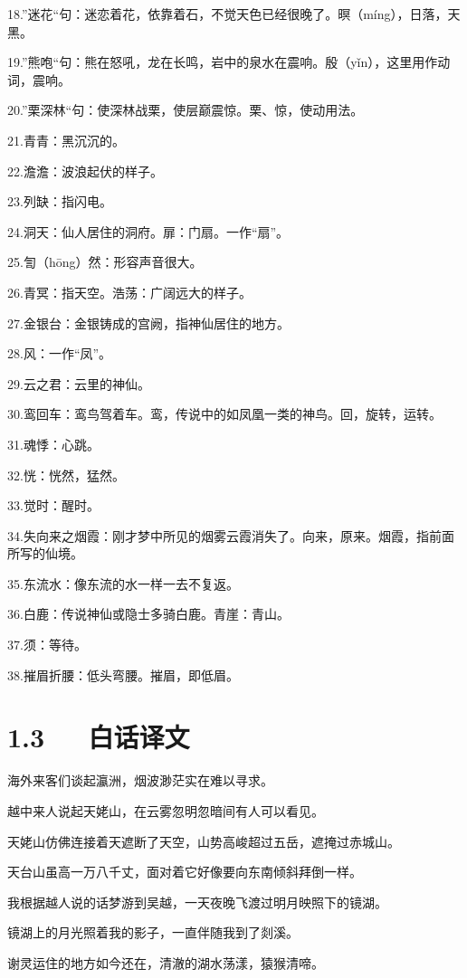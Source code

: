 \documentclass[letterpaper,10pt,english]{sphinxmanual}
\begin{document}
18.”迷花“句：迷恋着花，依靠着石，不觉天色已经很晚了。暝（míng），日落，天黑。

19.”熊咆“句：熊在怒吼，龙在长鸣，岩中的泉水在震响。殷（yǐn），这里用作动词，震响。

20.”栗深林“句：使深林战栗，使层巅震惊。栗、惊，使动用法。

21.青青：黑沉沉的。

22.澹澹：波浪起伏的样子。

23.列缺：指闪电。

24.洞天：仙人居住的洞府。扉：门扇。一作“扇”。

25.訇（hōng）然：形容声音很大。

26.青冥：指天空。浩荡：广阔远大的样子。

27.金银台：金银铸成的宫阙，指神仙居住的地方。

28.风：一作“凤”。

29.云之君：云里的神仙。

30.鸾回车：鸾鸟驾着车。鸾，传说中的如凤凰一类的神鸟。回，旋转，运转。

31.魂悸：心跳。

32.恍：恍然，猛然。

33.觉时：醒时。

34.失向来之烟霞：刚才梦中所见的烟雾云霞消失了。向来，原来。烟霞，指前面所写的仙境。

35.东流水：像东流的水一样一去不复返。

36.白鹿：传说神仙或隐士多骑白鹿。青崖：青山。

37.须：等待。

38.摧眉折腰：低头弯腰。摧眉，即低眉。


\section{1.3   白话译文}
\label{\detokenize{p01_u6563_u6587/_u674e_u767d-_u68a6_u6e38_u5929_u59e5_u541f_u7559_u522b:id5}}
海外来客们谈起瀛洲，烟波渺茫实在难以寻求。

越中来人说起天姥山，在云雾忽明忽暗间有人可以看见。

天姥山仿佛连接着天遮断了天空，山势高峻超过五岳，遮掩过赤城山。

天台山虽高一万八千丈，面对着它好像要向东南倾斜拜倒一样。

我根据越人说的话梦游到吴越，一天夜晚飞渡过明月映照下的镜湖。

镜湖上的月光照着我的影子，一直伴随我到了剡溪。

谢灵运住的地方如今还在，清澈的湖水荡漾，猿猴清啼。
\end{document}
